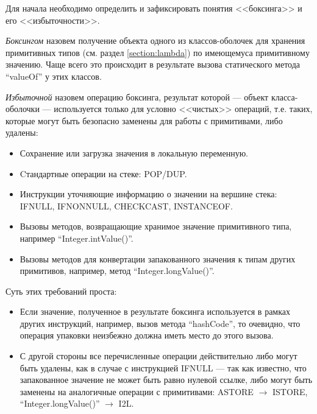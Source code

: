 Для начала необходимо определить и зафиксировать понятия <<боксинга>> и его <<избыточности>>.

\textit{Боксингом} назовем получение объекта одного из классов-оболочек для хранения примитивных
типов (см. раздел \ref{section:lambda}) по имеющемуса примитивному значению.
Чаще всего это происходит в результате вызова статического метода ``valueOf'' у этих классов.

\textit{Избыточной} назовем операцию боксинга, результат которой --- объект класса-оболочки ---
используется только для условно <<чистых>> операций, т.е. таких, которые могут быть
безопасно заменены для работы с примитивами, либо удалены:
\begin{itemize}
    \item Сохранение или загрузка значения в локальную переменную.
    \item Cтандартные операции на стеке: POP/DUP.
    \item Инструкции уточняющие информацию о значении на вершине стека: IFNULL, IFNONNULL,
    CHECKCAST, INSTANCEOF.
    \item Вызовы методов, возвращающие хранимое значение примитивного типа, например
    ``Integer.intValue()''.
    \item Вызовы методов для конвертации запакованного значения к типам других примитивов,
    например, метод ``Integer.longValue()''.
\end{itemize}

Суть этих требований проста:
\begin{itemize}
    \item Если значение, полученное в результате боксинга используется в рамках других инструкций,
    например, вызов метода ``hashCode'', то очевидно, что операция упаковки неизбежно должна иметь
    место до этого вызова.

    \item С другой стороны все перечисленные операции действительно либо могут быть удалены, как
    в случае с инструкцией IFNULL --- так как известно, что запакованное значение не может быть
    равно нулевой ссылке, либо могут быть заменены на аналогичные операции с примитивами:
    ASTORE $\to$ ISTORE, ``Integer.longValue()'' $\to$ I2L.
\end{itemize}

